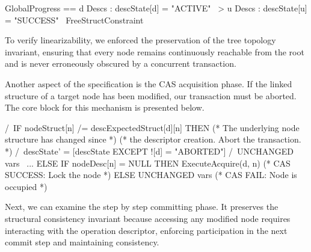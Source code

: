 \begin{tla}
GlobalProgress ==
  \E d \in Descs : descState[d] = "ACTIVE" ~>
    \E u \in Descs : descState[u] = "SUCCESS"
      \/ ~FreeStructConstraint
\end{tla}
\begin{tlatex}
%
%
%
\end{tlatex}

To verify linearizability, we enforced the preservation of the tree topology invariant, ensuring that every node remains continuously reachable from the root and is never erroneously obscured by a concurrent transaction.

Another aspect of the specification is the CAS acquisition phase. If the linked structure of a target node has been modified, our transaction must be aborted. The core block for this mechanism is presented below.

\begin{tla}
/\ IF nodeStruct[n] /= descExpectedStruct[d][n]
  THEN (* The underlying node structure has changed since *)
       (* the descriptor creation. Abort the transaction. *)
    /\ descState' = [descState EXCEPT ![d] = "ABORTED"]
    /\ UNCHANGED vars \ {...}
  ELSE IF nodeDesc[n] = NULL
  THEN ExecuteAcquire(d, n) (* CAS SUCCESS: Lock the node *)
  ELSE UNCHANGED vars (* CAS FAIL: Node is occupied *)
\end{tla}
\begin{tlatex}
%
%
\@xx{}%
%
%
\@xx{}%
%
%
%
%
\@xx{}%
%
%
\@xx{}%
\end{tlatex}

Next, we can examine the step by step committing phase. It preserves the structural consistency invariant because accessing any modified node requires interacting with the operation descriptor, enforcing participation in the next commit step and maintaining consistency.

